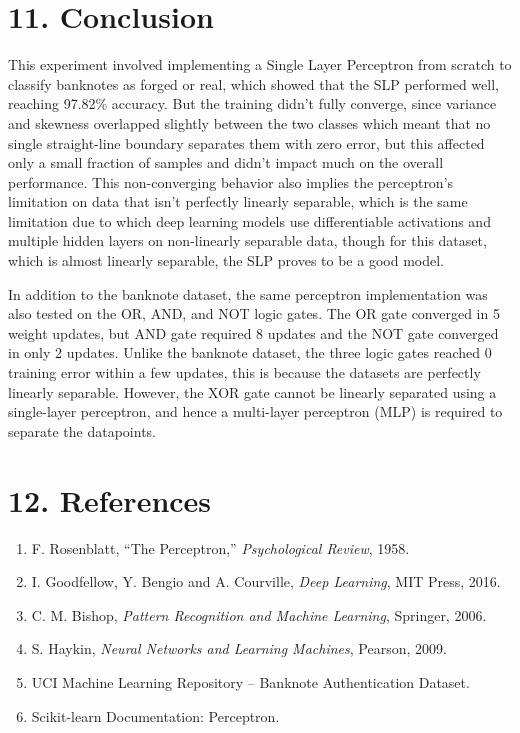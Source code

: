 \documentclass[11pt,a4paper]{article}
\begin{document}

\section*{11. Conclusion}

This experiment involved implementing a Single Layer Perceptron from scratch to classify banknotes as forged or real, which showed that the SLP performed well, reaching 97.82\% accuracy. But the training didn't fully converge, since variance and skewness overlapped slightly between the two classes which meant that no single straight-line boundary separates them with zero error, but this affected only a small fraction of samples and didn't impact much on the overall performance. This non-converging behavior also implies the perceptron's limitation on data that isn't perfectly linearly separable, which is the same limitation due to which deep learning models use differentiable activations and multiple hidden layers on non-linearly separable data, though for this dataset, which is almost linearly separable, the SLP proves to be a good model.

In addition to the banknote dataset, the same perceptron implementation was also tested on the OR, AND, and NOT logic gates. The OR gate converged in 5 weight updates, but AND gate required 8 updates and the NOT gate converged in only 2 updates. Unlike the banknote dataset, the three logic gates reached 0 training error within a few updates, this is because the datasets are perfectly linearly separable. However, the XOR gate cannot be linearly separated using a single-layer perceptron, and hence a multi-layer perceptron (MLP) is required to separate the datapoints.


\section*{12. References}

\begin{enumerate}
\item F. Rosenblatt, ``The Perceptron,'' \emph{Psychological Review}, 1958.
\item I. Goodfellow, Y. Bengio and A. Courville, \emph{Deep Learning}, MIT Press, 2016.
\item C. M. Bishop, \emph{Pattern Recognition and Machine Learning}, Springer, 2006.
\item S. Haykin, \emph{Neural Networks and Learning Machines}, Pearson, 2009.
\item UCI Machine Learning Repository -- Banknote Authentication Dataset.
\item Scikit-learn Documentation: Perceptron.
\end{enumerate}
\end{document}
